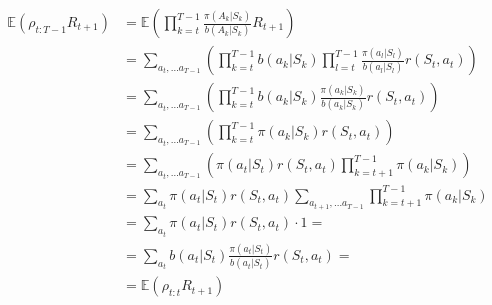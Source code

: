 \documentclass[12pt,a4paper]{article}
\begin{document}
\begin{enumerate}
    \begin{align*}
      \mathbb{E}(\rho_{t: T - 1} R_{t + 1})
      &= \mathbb{E}\left( \prod\limits_{k = t}^{T - 1} \frac{\pi(A_k | S_k)}{b(A_k | S_k)} R_{t + 1}\right) \\
      &= \sum\limits_{a_t, \dots a_{T - 1}} \left(\prod\limits_{k = t}^{T - 1} b(a_k | S_k) \prod\limits_{l = t}^{T - 1} \frac{\pi(a_l | S_l)}{b(a_l | S_l)} r(S_t, a_t) \right) \\
      &= \sum\limits_{a_t, \dots a_{T - 1}} \left(\prod\limits_{k = t}^{T - 1} b(a_k | S_k) \frac{\pi(a_k | S_k)}{b(a_k | S_k)} r(S_t, a_t) \right) \\
      &= \sum\limits_{a_t, \dots a_{T - 1}} \left(\prod\limits_{k = t}^{T - 1} \pi(a_k | S_k) r(S_t, a_t) \right) \\
      &= \sum\limits_{a_t, \dots a_{T - 1}} \left( \pi(a_t | S_t) r(S_t, a_t) \prod\limits_{k = t + 1}^{T - 1} \pi(a_k | S_k) \right) \\
      &= \sum\limits_{a_t} \pi(a_t | S_t) r(S_t, a_t) \sum\limits_{a_{t + 1}, \dots a_{T - 1}} \prod\limits_{k = t + 1}^{T - 1} \pi(a_k | S_k) \\
      &= \sum\limits_{a_t} \pi(a_t | S_t) r(S_t, a_t) \cdot 1 = \\
      &= \sum\limits_{a_t} b(a_t | S_t) \frac{\pi(a_t | S_t)}{b(a_t | S_t)} r(S_t, a_t) = \\
      &= \mathbb{E}(\rho_{t:t}R_{t + 1})\\
    \end{align*}

\end{enumerate}
\end{document}
